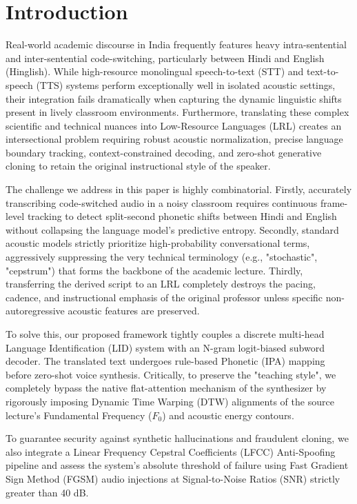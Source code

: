 \documentclass[10pt,conference]{IEEEtran}
\begin{document}
\section{Introduction}
Real-world academic discourse in India frequently features heavy intra-sentential and inter-sentential code-switching, particularly between Hindi and English (Hinglish). While high-resource monolingual speech-to-text (STT) and text-to-speech (TTS) systems perform exceptionally well in isolated acoustic settings, their integration fails dramatically when capturing the dynamic linguistic shifts present in lively classroom environments. Furthermore, translating these complex scientific and technical nuances into Low-Resource Languages (LRL) creates an intersectional problem requiring robust acoustic normalization, precise language boundary tracking, context-constrained decoding, and zero-shot generative cloning to retain the original instructional style of the speaker.

The challenge we address in this paper is highly combinatorial. Firstly, accurately transcribing code-switched audio in a noisy classroom requires continuous frame-level tracking to detect split-second phonetic shifts between Hindi and English without collapsing the language model's predictive entropy. Secondly, standard acoustic models strictly prioritize high-probability conversational terms, aggressively suppressing the very technical terminology (e.g., "stochastic", "cepstrum") that forms the backbone of the academic lecture. Thirdly, transferring the derived script to an LRL completely destroys the pacing, cadence, and instructional emphasis of the original professor unless specific non-autoregressive acoustic features are preserved.

To solve this, our proposed framework tightly couples a discrete multi-head Language Identification (LID) system with an N-gram logit-biased subword decoder. The translated text undergoes rule-based Phonetic (IPA) mapping before zero-shot voice synthesis. Critically, to preserve the "teaching style", we completely bypass the native flat-attention mechanism of the synthesizer by rigorously imposing Dynamic Time Warping (DTW) alignments of the source lecture's Fundamental Frequency ($F_0$) and acoustic energy contours. 

To guarantee security against synthetic hallucinations and fraudulent cloning, we also integrate a Linear Frequency Cepstral Coefficients (LFCC) Anti-Spoofing pipeline and assess the system's absolute threshold of failure using Fast Gradient Sign Method (FGSM) audio injections at Signal-to-Noise Ratios (SNR) strictly greater than 40 dB.
\end{document}
